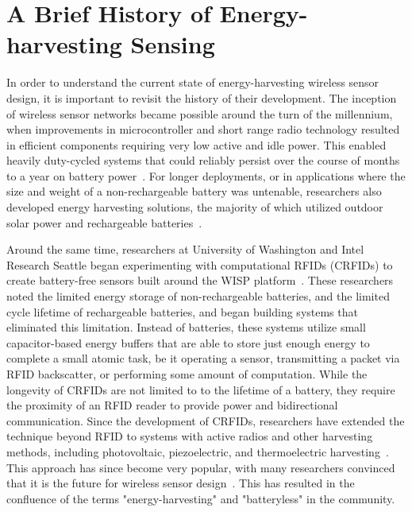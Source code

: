 \section{A Brief History of Energy-harvesting Sensing}
In order to understand the current state of energy-harvesting wireless sensor design, it is important to revisit the history of their development. The inception of wireless sensor networks became possible around the turn of the millennium, when improvements in microcontroller and short range radio technology resulted in efficient components requiring very low active and idle power. This enabled heavily duty-cycled systems that could reliably persist over the course of months to a year on battery power~\cite{mainwaring2002wireless,tolle2005macroscope}. For longer deployments, or in applications where the size and weight of a non-rechargeable battery was untenable, researchers also developed energy harvesting solutions, the majority of which utilized outdoor solar power and rechargeable batteries~\cite{juang2002energy,raghunathan2005design}.

Around the same time, researchers at University of Washington and Intel Research Seattle began experimenting with computational RFIDs (CRFIDs) to create battery-free sensors built around the WISP platform~\cite{sample2008design}. These researchers noted the limited energy storage of non-rechargeable batteries, and the limited cycle lifetime of rechargeable batteries, and began building systems that eliminated this limitation.
Instead of batteries, these systems utilize small capacitor-based energy buffers that are able to store just enough energy to complete a small atomic task, be it operating a sensor, transmitting a packet via RFID backscatter, or performing some amount of computation. 
While the longevity of CRFIDs are not limited to to the lifetime of a battery, they require the proximity of an RFID reader to provide power and bidirectional communication. 
Since the development of CRFIDs, researchers have extended the technique beyond RFID to systems with active radios and other harvesting methods, including photovoltaic, piezoelectric, and thermoelectric harvesting~\cite{yervaGrafting12, debruin2013monjolo, hesterFlicker17, colinReconfigurable18, nardello2019camaroptera}. This approach has since become very popular, with many researchers convinced that it is the future for wireless sensor design~\cite{hester2017future}. This has resulted in the confluence of the terms "energy-harvesting" and "batteryless" in the community. 

